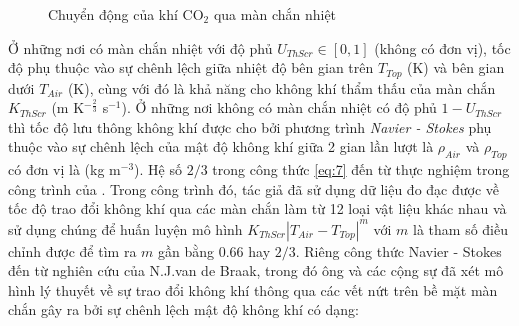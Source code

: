 \documentclass[a4paper]{article}
\begin{document}
\begin{figure}

    \caption{Chuyển động của khí $\mathrm{CO_2}$ qua màn chắn nhiệt}
    \label{fig:thermalscreen}
\end{figure}
Ở những nơi có màn chắn nhiệt với độ phủ $U_{ThScr} \in [0,1]$ (không có đơn vị), tốc độ phụ thuộc vào sự chênh lệch giữa nhiệt độ bên gian trên $T_{Top}$ (K) và bên gian dưới $T_{Air}$ (K), cùng với đó là khả năng cho không khí thẩm thấu của màn chắn $K_{ThScr}$ (m K$^{-\frac{2}{3}}$ s$^{-1}$). Ở những nơi không có màn chắn nhiệt có độ phủ $1 - U_{ThScr}$ thì tốc độ lưu thông không khí được cho bởi phương trình \emph{Navier - Stokes} phụ thuộc vào sự chênh lệch của mật độ không khí giữa 2 gian lần lượt là $\rho_{Air}$ và $\rho_{Top}$ có đơn vị là (kg m$^{-3}$). Hệ số $2/3$ trong công thức \eqref{eq:7} đến từ thực nghiệm trong công trình của \cite{balemans1992assessment}. Trong công trình đó, tác giả đã sử dụng dữ liệu đo đạc được về tốc độ trao đổi không khí qua các màn chắn làm từ 12 loại vật liệu khác nhau và sử dụng chúng để huấn luyện mô hình $K_{ThScr}|T_{Air} - T_{Top}|^m$ với $m$ là tham số điều chỉnh được để tìm ra $m$ gần bằng $0.66$ hay $2/3$. Riêng công thức Navier - Stokes đến từ nghiên cứu của N.J.van de Braak, trong đó ông và các cộng sự đã xét mô hình lý thuyết về sự trao đổi không khí thông qua các vết nứt trên bề mặt màn chắn gây ra bởi sự chênh lệch mật độ không khí có dạng:
\end{document}
